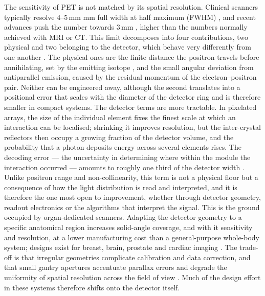 \documentclass[10pt,conference]{IEEEtran}
\begin{document}
The sensitivity of PET is not matched by its spatial resolution. Clinical
scanners typically resolve 4--5\,mm mm full width at half maximum
(FWHM) \cite{spencer2021}, and
recent advances push the number towards 3\,mm \cite{spencer2021,
gonzalezmontoro2022brain}, higher than the numbers normally achieved with MRI or CT. This limit decomposes into four
contributions, two physical and two belonging to the detector, which behave
very differently from one another \cite{moses2011}. The physical ones are
the finite distance the positron travels before annihilating, set by the
emitting isotope \cite{levin1999}, and the small angular deviation from
antiparallel emission, caused by the residual momentum of the
electron--positron pair. Neither can be engineered away, although the second
translates into a positional error that scales with the diameter of the
detector ring and is therefore smaller in compact systems. The detector terms are more tractable. In pixelated arrays, the size of the
individual element fixes the finest scale at which an interaction can be
localised; shrinking it improves resolution, but the inter-crystal
reflectors then occupy a growing fraction of the detector volume, and the
probability that a photon deposits energy across several elements rises.
The decoding error --- the uncertainty in determining where within the
module the interaction occurred --- amounts to roughly one third of the
detector width \cite{moses2011}. Unlike positron range and non-collinearity,
this term is not a physical floor but a consequence of how the light
distribution is read and interpreted, and it is therefore the one most open to improvement, whether through detector geometry, readout electronics or the algorithms that interpret
the signal.
This is the ground occupied by organ-dedicated scanners. Adapting the
detector geometry to a specific anatomical region increases solid-angle
coverage, and with it sensitivity and resolution, at a lower manufacturing
cost than a general-purpose whole-body system; designs exist for breast,
brain, prostate and cardiac imaging \cite{sanaat2024}. The trade-off is that
irregular geometries complicate calibration and data correction, and that
small gantry apertures accentuate parallax errors and degrade the uniformity
of spatial resolution across the field of view \cite{sanaat2024}. Much of
the design effort in these systems therefore shifts onto the detector
itself.
\end{document}
